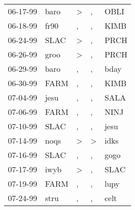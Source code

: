 \begin{supertabular}{p{0.07\textwidth}p{0.06\textwidth}p{0.02\textwidth}p{0.02\textwidth}p{0.06\textwidth}}
          06-17-99\textsuperscript{} &           baro\textsuperscript{} &     \textgreater &                , &           OBLI\textsuperscript{} \\
          06-18-99\textsuperscript{} &           fr90\textsuperscript{} &                , &                , &           KIMB\textsuperscript{} \\
          06-24-99\textsuperscript{} &           SLAC\textsuperscript{} &     \textgreater &                , &           PRCH\textsuperscript{} \\
          06-26-99\textsuperscript{} &           groo\textsuperscript{} &     \textgreater &                , &           PRCH\textsuperscript{} \\
          06-29-99\textsuperscript{} &           baro\textsuperscript{} &                , &                , &           bday\textsuperscript{} \\
          06-30-99\textsuperscript{} &           FARM\textsuperscript{} &                , &                , &           KIMB\textsuperscript{} \\
          07-04-99\textsuperscript{} &           jesu\textsuperscript{} &                , &                , &           SALA\textsuperscript{} \\
          07-06-99\textsuperscript{} &           FARM\textsuperscript{} &                , &                , &           NINJ\textsuperscript{} \\
          07-10-99\textsuperscript{} &           SLAC\textsuperscript{} &                , &                , &           jesu\textsuperscript{} \\
          07-14-99\textsuperscript{} &           noqs\textsuperscript{} &     \textgreater &     \textgreater &           idks\textsuperscript{} \\
          07-16-99\textsuperscript{} &           SLAC\textsuperscript{} &                , &                , &           gogo\textsuperscript{} \\
          07-17-99\textsuperscript{} &           iwyb\textsuperscript{} &     \textgreater &                , &           SLAC\textsuperscript{} \\
          07-19-99\textsuperscript{} &           FARM\textsuperscript{} &                , &                , &           lupy\textsuperscript{} \\
          07-24-99\textsuperscript{} &           stru\textsuperscript{} &                , &                , &           celt\textsuperscript{} \\

\end{supertabular}
